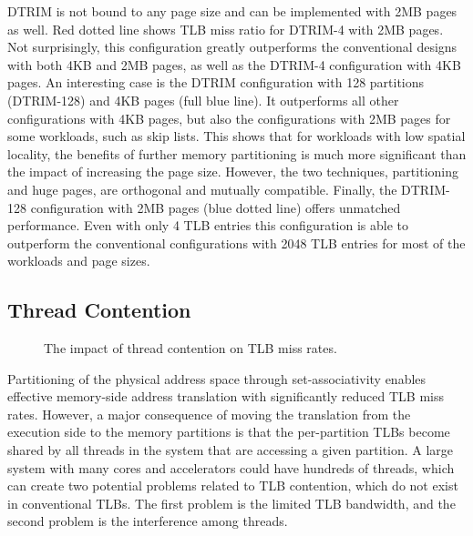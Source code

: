 DTRIM is not bound to any page size and can be implemented with 2MB pages as well. Red dotted line shows TLB miss ratio for DTRIM-4 with 2MB pages. Not surprisingly, this configuration greatly outperforms the conventional designs with both 4KB and 2MB pages, as well as the DTRIM-4 configuration with 4KB pages. An interesting case is the DTRIM configuration with 128 partitions (DTRIM-128) and 4KB pages (full blue line). It outperforms all other configurations with 4KB pages, but also the configurations with 2MB pages for some workloads, such as skip lists. This shows that for workloads with low spatial locality, the benefits of further memory partitioning is much more significant than the impact of increasing the page size. However, the two techniques, partitioning and huge pages, are orthogonal and mutually compatible. Finally, the DTRIM-128 configuration with 2MB pages (blue dotted line) offers unmatched performance. Even with only 4 TLB entries this configuration is able to outperform the conventional configurations with 2048 TLB entries for most of the workloads and page sizes.


\subsection{Thread Contention}
\begin{figure}[t]
    \centering
    \caption{The impact of thread contention on TLB miss rates.}
    \label{fig:contention}
\end{figure}


Partitioning of the physical address space through set-associativity
enables effective memory-side address translation with significantly
reduced TLB miss rates.  However, a major consequence of moving the
translation from the execution side to the memory partitions is that the
per-partition TLBs become shared by all threads in the system that are
accessing a given partition. A large system with many cores and
accelerators could have hundreds of threads, which can create two
potential problems related to TLB contention, which do not exist in
conventional TLBs. The first problem is the limited TLB bandwidth, and
the second problem is the interference among threads.

